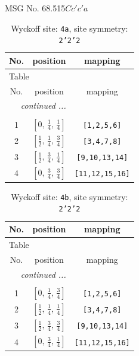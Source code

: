 \documentclass[fleqn,8pt]{jsarticle}
\begin{document}
\setcounter{MaxMatrixCols}{32}

\renewcommand{\tablename}{Table~}
\renewcommand{\figurename}{Figure~}
\begin{center}
\LARGE
MSG No. 68.515\quad$Cc'c'a$
\end{center}
\renewcommand{\arraystretch}{1.2}
\begin{longtable}{ccc}
\caption{Wyckoff site: {\tt 4a}, site symmetry: {\tt 2'2'2}}
 \\
 \hline \hline
No. & position & mapping \\ \hline \endfirsthead

\multicolumn{2}{l}{\tablename\ \thetable{}} \\
 \hline \hline
No. & position & mapping \\ \hline \endhead

 \hline \hline
\multicolumn{2}{r}{\footnotesize\it continued ...} \\ \endfoot

 \hline \hline
\multicolumn{2}{r}{} \\ \endlastfoot

1 & $\left[ 0,\, \frac{1}{4},\, \frac{1}{4} \right]$ & {\tt [1,2,5,6]} \\ \hline
2 & $\left[ \frac{1}{2},\, \frac{1}{4},\, \frac{3}{4} \right]$ & {\tt [3,4,7,8]} \\ \hline
3 & $\left[ \frac{1}{2},\, \frac{3}{4},\, \frac{1}{4} \right]$ & {\tt [9,10,13,14]} \\ \hline
4 & $\left[ 0,\, \frac{3}{4},\, \frac{3}{4} \right]$ & {\tt [11,12,15,16]} \\
\end{longtable}
\renewcommand{\arraystretch}{1.2}
\begin{longtable}{ccc}
\caption{Wyckoff site: {\tt 4b}, site symmetry: {\tt 2'2'2}}
 \\
 \hline \hline
No. & position & mapping \\ \hline \endfirsthead

\multicolumn{2}{l}{\tablename\ \thetable{}} \\
 \hline \hline
No. & position & mapping \\ \hline \endhead

 \hline \hline
\multicolumn{2}{r}{\footnotesize\it continued ...} \\ \endfoot

 \hline \hline
\multicolumn{2}{r}{} \\ \endlastfoot

1 & $\left[ 0,\, \frac{1}{4},\, \frac{3}{4} \right]$ & {\tt [1,2,5,6]} \\ \hline
2 & $\left[ \frac{1}{2},\, \frac{1}{4},\, \frac{1}{4} \right]$ & {\tt [3,4,7,8]} \\ \hline
3 & $\left[ \frac{1}{2},\, \frac{3}{4},\, \frac{3}{4} \right]$ & {\tt [9,10,13,14]} \\ \hline
4 & $\left[ 0,\, \frac{3}{4},\, \frac{1}{4} \right]$ & {\tt [11,12,15,16]} \\
\end{longtable}
\end{document}
